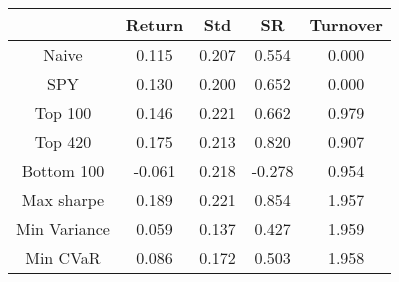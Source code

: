 \begin{table}[]
\begin{tabular}{ccccc}
\hline
             & Return   & Std      & SR       & Turnover \\ \hline
Naive        & 0.115 & 0.207 & 0.554 & 0.000 \\
SPY          & 0.130 & 0.200 & 0.652 & 0.000 \\
Top 100      & 0.146 & 0.221 & 0.662 & 0.979 \\
Top 420      & 0.175 & 0.213 & 0.820 & 0.907 \\
Bottom 100   & -0.061 & 0.218 & -0.278 & 0.954 \\
Max sharpe   & 0.189 & 0.221 & 0.854 & 1.957 \\
Min Variance & 0.059 & 0.137 & 0.427 & 1.959 \\
Min CVaR     & 0.086 & 0.172 & 0.503 & 1.958 \\
\hline
\end{tabular}
\end{table}